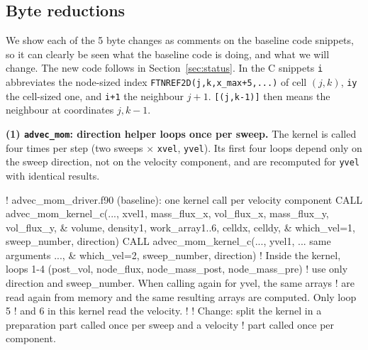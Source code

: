 \documentclass[a4paper,11pt]{article}
\newcommand{\kernel}[1]{\texttt{#1}}
\begin{document}
\subsection{Byte reductions}
\label{sec:bytes}
We show each of the 5 byte changes as comments on the baseline code snippets, so it can clearly be seen what the baseline code is doing, and what we will change.
The new code follows in Section~\ref{sec:status}. In the C snippets \texttt{i} abbreviates the node-sized
index \texttt{FTNREF2D(j,k,x\_max+5,...)} of cell $(j,k)$, \texttt{iy} the cell-sized one, and
\texttt{i+1} the neighbour $j+1$. \texttt{[(j,k-1)]} then means the neighbour at coordinates $j,k-1$.

\textbf{(1) \kernel{advec\_mom}: direction helper loops once per sweep.}
The kernel is called four times per step (two sweeps $\times$ \texttt{xvel}, \texttt{yvel}).
Its first four loops depend only on the sweep direction, not on the velocity component, and are recomputed for \texttt{yvel} with identical results.
\begin{code}[language={[90]Fortran}]
! advec_mom_driver.f90 (baseline): one kernel call per velocity component
CALL advec_mom_kernel_c(..., xvel1, mass_flux_x, vol_flux_x, mass_flux_y, vol_flux_y, &
                        volume, density1, work_array1..6, celldx, celldy,             &
                        which_vel=1, sweep_number, direction)
CALL advec_mom_kernel_c(..., yvel1, ... same arguments ...,                          &
                        which_vel=2, sweep_number, direction)
! Inside the kernel, loops 1-4 (post_vol, node_flux, node_mass_post, node_mass_pre)
! use only direction and sweep_number. When calling again for yvel, the same arrays
! are read again from memory and the same resulting arrays are computed. Only loop 5
! and 6 in this kernel read the velocity.
!
! Change: split the kernel in a preparation part called once per sweep and a velocity
! part called once per component.
\end{code}
\end{document}

